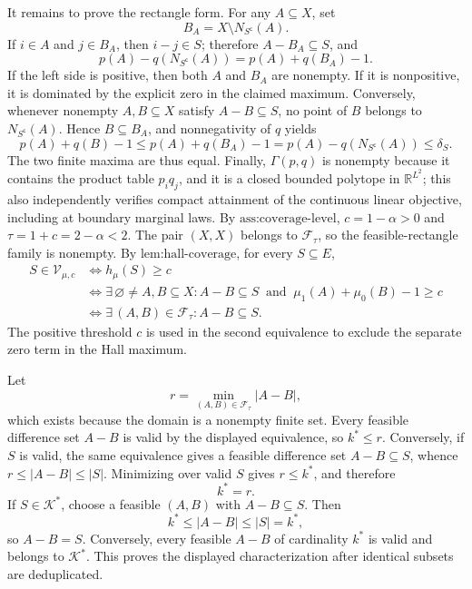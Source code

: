 It remains to prove the rectangle form.  For any \(A\subseteq X\), set
\[
B_A=X\setminus N_{S^{\mathsf c}}(A).
\]
If \(i\in A\) and \(j\in B_A\), then \(i-j\in S\); therefore \(A-B_A\subseteq S\), and
\[
p(A)-q(N_{S^{\mathsf c}}(A))=p(A)+q(B_A)-1.
\]
If the left side is positive, then both \(A\) and \(B_A\) are nonempty.  If it is nonpositive, it is dominated by the explicit zero in the claimed maximum.  Conversely, whenever nonempty \(A,B\subseteq X\) satisfy \(A-B\subseteq S\), no point of \(B\) belongs to \(N_{S^{\mathsf c}}(A)\).  Hence \(B\subseteq B_A\), and nonnegativity of \(q\) yields
\[
p(A)+q(B)-1\leq p(A)+q(B_A)-1
=p(A)-q(N_{S^{\mathsf c}}(A))\leq\delta_S.
\]
The two finite maxima are thus equal.  Finally, \(\Gamma(p,q)\) is nonempty because it contains the product table \(p_iq_j\), and it is a closed bounded polytope in \(\mathbb R^{L^2}\); this also independently verifies compact attainment of the continuous linear objective, including at boundary marginal laws.
By \(\text{ass:coverage-level}\), \(c=1-\alpha>0\) and \(\tau=1+c=2-\alpha<2\).  The pair \((X,X)\) belongs to \(\mathcal F_{\tau}\), so the feasible-rectangle family is nonempty.  By \(\text{lem:hall-coverage}\), for every \(S\subseteq E\),
\[
\begin{aligned}
S\in\mathcal V_{\mu,c}
&\iff h_{\mu}(S)\geq c\\
&\iff \exists\,\varnothing\neq A,B\subseteq X:
A-B\subseteq S\ \text{ and }\ \mu_1(A)+\mu_0(B)-1\geq c\\
&\iff \exists\,(A,B)\in\mathcal F_{\tau}:A-B\subseteq S.
\end{aligned}
\]
The positive threshold \(c\) is used in the second equivalence to exclude the separate zero term in the Hall maximum.

Let
\[
r=\min_{(A,B)\in\mathcal F_{\tau}}|A-B|,
\]
which exists because the domain is a nonempty finite set.  Every feasible difference set \(A-B\) is valid by the displayed equivalence, so \(k^*\leq r\).  Conversely, if \(S\) is valid, the same equivalence gives a feasible difference set \(A-B\subseteq S\), whence \(r\leq|A-B|\leq|S|\).  Minimizing over valid \(S\) gives \(r\leq k^*\), and therefore
\[
k^*=r.
\]
If \(S\in\mathcal K^*\), choose a feasible \((A,B)\) with \(A-B\subseteq S\).  Then
\[
k^*\leq|A-B|\leq|S|=k^*,
\]
so \(A-B=S\).  Conversely, every feasible \(A-B\) of cardinality \(k^*\) is valid and belongs to \(\mathcal K^*\).  This proves the displayed characterization after identical subsets are deduplicated.

